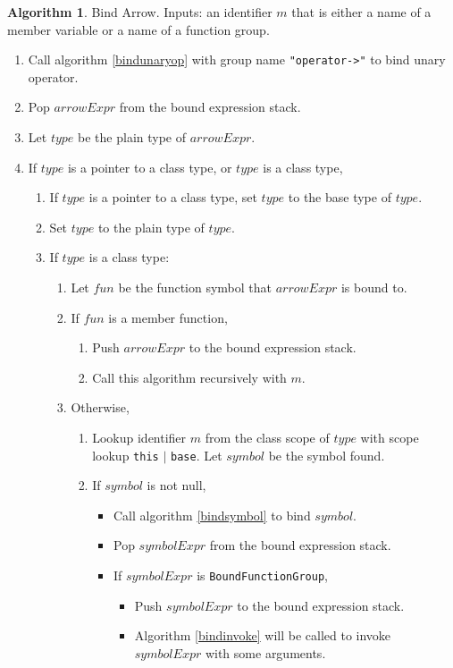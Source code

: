 \documentclass[a4paper,oneside,11pt]{book}
\theoremstyle{definition}
\newtheorem{algo}{Algorithm}[section]
\begin{document}
\begin{algo}\label{bindarrow} Bind Arrow.
Inputs: an identifier $m$ that is either a name of a member variable or a name of a function group.
\begin{enumerate}
\item
Call algorithm \ref{bindunaryop} with group name \verb|"operator->"| to bind unary operator.
\item
Pop $arrowExpr$ from the bound expression stack.
\item
Let $type$ be the plain type of $arrowExpr$.
\item
If $type$ is a pointer to a class type, or $type$ is a class type,
\begin{enumerate}
\item
If $type$ is a pointer to a class type, set $type$ to the base type of $type$.
\item
Set $type$ to the plain type of $type$.
\item
If $type$ is a class type:
\begin{enumerate}
\item
Let $fun$ be the function symbol that $arrowExpr$ is bound to.
\item
If $fun$ is a member function,
\begin{enumerate}
\item
Push $arrowExpr$ to the bound expression stack.
\item
Call this algorithm recursively with $m$.
\end{enumerate}
\item
Otherwise,
\begin{enumerate}
\item
Lookup identifier $m$ from the class scope of $type$ with scope lookup \verb|this| $|$ \verb|base|. Let $symbol$ be the symbol found.
\item
If $symbol$ is not null,
\begin{itemize}
\item
Call algorithm \ref{bindsymbol} to bind $symbol$.
\item
Pop $symbolExpr$ from the bound expression stack.
\item
If $symbolExpr$ is \verb|BoundFunctionGroup|,
\begin{itemize}
\item
Push $symbolExpr$ to the bound expression stack.
\item
Algorithm \ref{bindinvoke} will be called to invoke $symbolExpr$ with some arguments.
\end{itemize}

\end{itemize}
\end{enumerate}
\end{enumerate}
\end{enumerate}
\end{enumerate}
\end{algo}
\end{document}
